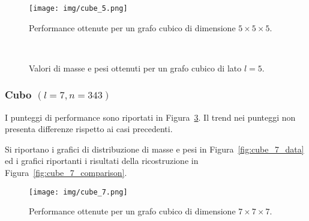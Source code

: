 \documentclass[10pt,a4paper]{article}
\begin{document}
\begin{figure}[p]
    \centering
    \texttt{[image: img/cube\_5.png]}
    \caption{Performance ottenute per un grafo cubico di dimensione \(5 \times 5 \times 5\).}\label{fig:cube_5_performance}
\end{figure}

\begin{figure}[p]
    \centering
    \\
    \caption{Valori di masse e pesi ottenuti per un grafo cubico di lato \(l=5\).}\label{fig:cube_5_data}
\end{figure}

\subsubsection{Cubo \((l = 7, n = 343)\)}

I punteggi di performance sono riportati in Figura~\ref{fig:cube_7_performance}.
Il trend nei punteggi non presenta differenze rispetto ai casi precedenti.

Si riportano i grafici di distribuzione di masse e pesi in Figura~\ref{fig:cube_7_data} ed i grafici riportanti i risultati della ricostruzione in Figura~\ref{fig:cube_7_comparison}.

\begin{figure}[p]
    \centering
    \texttt{[image: img/cube\_7.png]}
    \caption{Performance ottenute per un grafo cubico di dimensione \(7 \times 7 \times 7\).}\label{fig:cube_7_performance}
\end{figure}
\end{document}
